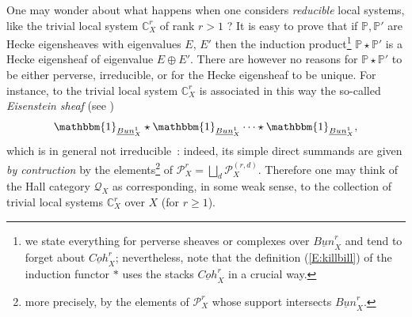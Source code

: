 \documentclass[a4paper,10pt]{amsart}
\def\C{\mathbb{C}}
\numberwithin{equation}{section}
\begin{document}
One may wonder about what happens when one considers \textit{reducible} local systems, like the trivial local system $\C^r_X$ of rank $r >1$ ? It is easy to prove that if $\mathbb{P}, \mathbb{P}'$ are Hecke eigensheaves with eigenvalues $E$, $E'$ then the induction product\footnote{we state everything for perverse sheaves or complexes over $\underline{Bun}^r_X$ and tend to forget about $\underline{Coh}^r_X$; nevertheless, note that the definition (\ref{E:killbill}) of the induction functor $*$ uses the stacks $\underline{Coh}^r_X$ in a crucial way.} $\mathbb{P} \star \mathbb{P}'$ is a Hecke eigensheaf of eigenvalue $E \oplus E'$. There are however no reasons for $\mathbb{P} \star \mathbb{P}'$ to be either perverse, irreducible, or  for the Hecke eigensheaf to be unique. For instance, to the trivial local system $\C^r_X$ is associated in this way the so-called \textit{Eisenstein sheaf} (see \cite{Laumon})
$$\mathbbm{1}_{\underline{Bun}^1_X} \star \mathbbm{1}_{\underline{Bun}^1_X} \cdots \star \mathbbm{1}_{\underline{Bun}^1_X},$$
which is in general not irreducible~: indeed, its simple direct summands are given \textit{by contruction} by the elements\footnote{more precisely, by the elements of $\mathcal{P}_X^{r}$ whose support intersects $\underline{Bun}^r_X$.} of $\mathcal{P}_X^r=\bigsqcup_d \mathcal{P}_X^{(r,d)}$. Therefore one may think of the Hall category $\mathcal{Q}_X$ as corresponding, in some weak sense, to the collection of trivial local systems $\C^r_X$ over $X$ (for $r \geq 1$).

\vspace{.1in}
\end{document}
